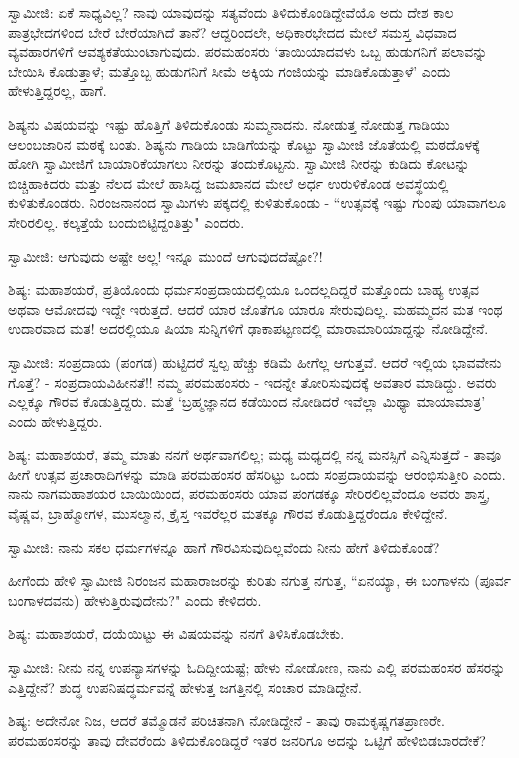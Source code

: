 ಸ್ವಾಮೀಜಿ: ಏಕೆ ಸಾಧ್ಯವಿಲ್ಲ? ನಾವು ಯಾವುದನ್ನು ಸತ್ಯವೆಂದು ತಿಳಿದುಕೊಂಡಿದ್ದೇವೆಯೊ ಅದು ದೇಶ ಕಾಲ ಪಾತ್ರಭೇದಗಳಿಂದ ಬೇರೆ ಬೇರೆಯಾಗಿದೆ ತಾನೆ? ಆದ್ದರಿಂದಲೇ, ಅಧಿಕಾರಭೇದದ ಮೇಲೆ ಸಮಸ್ತ ವಿಧವಾದ ವ್ಯವಹಾರಗಳಿಗೆ ಆವಶ್ಯಕತೆಯುಂಟಾಗುವುದು. ಪರಮಹಂಸರು ‘ತಾಯಿಯಾದವಳು ಒಬ್ಬ ಹುಡುಗನಿಗೆ ಪಲಾವನ್ನು ಬೇಯಿಸಿ ಕೊಡುತ್ತಾಳೆ; ಮತ್ತೊಬ್ಬ ಹುಡುಗನಿಗೆ ಸೀಮೆ ಅಕ್ಕಿಯ ಗಂಜಿಯನ್ನು ಮಾಡಿಕೊಡುತ್ತಾಳೆ’ ಎಂದು ಹೇಳುತ್ತಿದ್ದರಲ್ಲ, ಹಾಗೆ.

ಶಿಷ್ಯನು ವಿಷಯವನ್ನು ಇಷ್ಟು ಹೊತ್ತಿಗೆ ತಿಳಿದುಕೊಂಡು ಸುಮ್ಮನಾದನು. ನೋಡುತ್ತ ನೋಡುತ್ತ ಗಾಡಿಯು ಆಲಂಬಜಾರಿನ ಮಠಕ್ಕೆ ಬಂತು. ಶಿಷ್ಯನು ಗಾಡಿಯ ಬಾಡಿಗೆಯನ್ನು ಕೊಟ್ಟು ಸ್ವಾಮೀಜಿ ಜೊತೆಯಲ್ಲಿ ಮಠದೊಳಕ್ಕೆ ಹೋಗಿ ಸ್ವಾಮೀಜಿಗೆ ಬಾಯಾರಿಕೆಯಾಗಲು ನೀರನ್ನು ತಂದುಕೊಟ್ಟನು. ಸ್ವಾಮೀಜಿ ನೀರನ್ನು ಕುಡಿದು ಕೋಟನ್ನು ಬಿಚ್ಚಿಹಾಕಿದರು ಮತ್ತು ನೆಲದ ಮೇಲೆ ಹಾಸಿದ್ದ ಜಮಖಾನದ ಮೇಲೆ ಅರ್ಧ ಉರುಳಿಕೊಂಡ ಅವಸ್ಥೆಯಲ್ಲಿ ಕುಳಿತುಕೊಂಡರು. ನಿರಂಜನಾನಂದ ಸ್ವಾಮಿಗಳು ಪಕ್ಕದಲ್ಲಿ ಕುಳಿತುಕೊಂಡು - “ಉತ್ಸವಕ್ಕೆ ಇಷ್ಟು ಗುಂಪು ಯಾವಾಗಲೂ ಸೇರಿರಲಿಲ್ಲ. ಕಲ್ಕತ್ತೆಯೆ ಬಂದುಬಿಟ್ಟಿದ್ದಂತಿತ್ತು" ಎಂದರು.

ಸ್ವಾಮೀಜಿ: ಆಗುವುದು ಅಷ್ಟೇ ಅಲ್ಲ! ಇನ್ನೂ ಮುಂದೆ ಆಗುವುದದೆಷ್ಟೋ?!

ಶಿಷ್ಯ: ಮಹಾಶಯರೆ, ಪ್ರತಿಯೊಂದು ಧರ್ಮಸಂಪ್ರದಾಯದಲ್ಲಿಯೂ ಒಂದಲ್ಲದಿದ್ದರೆ ಮತ್ತೊಂದು ಬಾಹ್ಯ ಉತ್ಸವ ಅಥವಾ ಆಮೋದವು ಇದ್ದೇ ಇರುತ್ತದೆ. ಆದರೆ ಯಾರ ಜೊತೆಗೂ ಯಾರೂ ಸೇರುವುದಿಲ್ಲ. ಮಹಮ್ಮದನ ಮತ ಇಂಥ ಉದಾರವಾದ ಮತ! ಅದರಲ್ಲಿಯೂ ಷಿಯಾ ಸುನ್ನಿಗಳಿಗೆ ಢಾಕಾಪಟ್ಟಣದಲ್ಲಿ ಮಾರಾಮಾರಿಯಾದ್ದನ್ನು ನೋಡಿದ್ದೇನೆ.

ಸ್ವಾಮೀಜಿ: ಸಂಪ್ರದಾಯ (ಪಂಗಡ) ಹುಟ್ಟಿದರೆ ಸ್ವಲ್ಪ ಹೆಚ್ಚು ಕಡಿಮೆ ಹೀಗೆಲ್ಲ ಆಗುತ್ತವೆ. ಆದರೆ ಇಲ್ಲಿಯ ಭಾವವೇನು ಗೊತ್ತೆ? - ಸಂಪ್ರದಾಯವಿಹೀನತೆ!! ನಮ್ಮ ಪರಮಹಂಸರು - ಇದನ್ನೇ ತೋರಿಸುವುದಕ್ಕೆ ಅವತಾರ ಮಾಡಿದ್ದು. ಅವರು ಎಲ್ಲಕ್ಕೂ ಗೌರವ ಕೊಡುತ್ತಿದ್ದರು. ಮತ್ತೆ ‘ಬ್ರಹ್ಮಜ್ಞಾನದ ಕಡೆಯಿಂದ ನೋಡಿದರೆ ಇವೆಲ್ಲಾ ಮಿಥ್ಯಾ ಮಾಯಾಮಾತ್ರ’ ಎಂದು ಹೇಳುತ್ತಿದ್ದರು.

ಶಿಷ್ಯ: ಮಹಾಶಯರೆ, ತಮ್ಮ ಮಾತು ನನಗೆ ಅರ್ಥವಾಗಲಿಲ್ಲ; ಮಧ್ಯ ಮಧ್ಯದಲ್ಲಿ ನನ್ನ ಮನಸ್ಸಿಗೆ ಎನ್ನಿಸುತ್ತದೆ - ತಾವೂ ಹೀಗೆ ಉತ್ಸವ ಪ್ರಚಾರಾದಿಗಳನ್ನು ಮಾಡಿ ಪರಮಹಂಸರ ಹೆಸರಿಟ್ಟು ಒಂದು ಸಂಪ್ರದಾಯವನ್ನು ಆರಂಭಿಸುತ್ತೀರಿ ಎಂದು. ನಾನು ನಾಗಮಹಾಶಯರ ಬಾಯಿಯಿಂದ, ಪರಮಹಂಸರು ಯಾವ ಪಂಗಡಕ್ಕೂ ಸೇರಿರಲಿಲ್ಲವೆಂದೂ ಅವರು ಶಾಸ್ತ್ರ, ವೈಷ್ಣವ, ಬ್ರಾಹ್ಮೋಗಳ, ಮುಸಲ್ಮಾನ, ಕ್ರೈಸ್ತ ಇವರೆಲ್ಲರ ಮತಕ್ಕೂ ಗೌರವ ಕೊಡುತ್ತಿದ್ದರೆಂದೂ ಕೇಳಿದ್ದೇನೆ.

ಸ್ವಾಮೀಜಿ: ನಾನು ಸಕಲ ಧರ್ಮಗಳನ್ನೂ ಹಾಗೆ ಗೌರವಿಸುವುದಿಲ್ಲವೆಂದು ನೀನು ಹೇಗೆ ತಿಳಿದುಕೊಂಡೆ?

ಹೀಗೆಂದು ಹೇಳಿ ಸ್ವಾಮೀಜಿ ನಿರಂಜನ ಮಹಾರಾಜರನ್ನು ಕುರಿತು ನಗುತ್ತ ನಗುತ್ತ, “ಏನಯ್ಯಾ, ಈ ಬಂಗಾಳನು (ಪೂರ್ವ ಬಂಗಾಳದವನು) ಹೇಳುತ್ತಿರುವುದೇನು?" ಎಂದು ಕೇಳಿದರು.

ಶಿಷ್ಯ: ಮಹಾಶಯರೆ, ದಯೆಯಿಟ್ಟು ಈ ವಿಷಯವನ್ನು ನನಗೆ ತಿಳಿಸಿಕೊಡಬೇಕು.

ಸ್ವಾಮೀಜಿ: ನೀನು ನನ್ನ ಉಪನ್ಯಾಸಗಳನ್ನು ಓದಿದ್ದೀಯಷ್ಟೆ; ಹೇಳು ನೋಡೋಣ, ನಾನು ಎಲ್ಲಿ ಪರಮಹಂಸರ ಹೆಸರನ್ನು ಎತ್ತಿದ್ದೇನೆ? ಶುದ್ಧ ಉಪನಿಷದ್ಧರ್ಮವನ್ನೆ ಹೇಳುತ್ತ ಜಗತ್ತಿನಲ್ಲಿ ಸಂಚಾರ ಮಾಡಿದ್ದೇನೆ.

ಶಿಷ್ಯ: ಅದೇನೋ ನಿಜ, ಆದರೆ ತಮ್ಮೊಡನೆ ಪರಿಚಿತನಾಗಿ ನೋಡಿದ್ದೇನೆ - ತಾವು ರಾಮಕೃಷ್ಣಗತಪ್ರಾಣರೇ. ಪರಮಹಂಸರನ್ನು ತಾವು ದೇವರೆಂದು ತಿಳಿದುಕೊಂಡಿದ್ದರೆ ಇತರ ಜನರಿಗೂ ಅದನ್ನು ಒಟ್ಟಿಗೆ ಹೇಳಿಬಿಡಬಾರದೇಕೆ?

